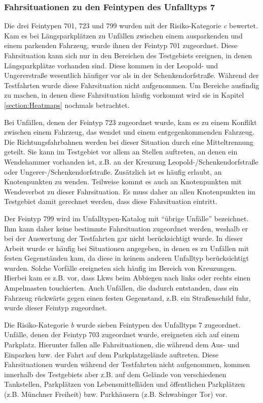 \subsubsection{Fahrsituationen zu den Feintypen des Unfalltyps 7}
Die drei Feintypen 701, 723 und 799 wurden mit der Risiko-Kategorie \textit{c} bewertet. Kam es bei Längsparkplätzen zu Unfällen zwischen einem ausparkenden und einem parkenden Fahrzeug, wurde ihnen der Feintyp 701 zugeordnet. Diese Fahrsituation kann sich nur in den Bereichen des Testgebiets ereignen, in denen Längsparkplätze vorhanden sind. Diese kommen in der Leopold- und Ungererstraße wesentlich häufiger vor als in der Schenkendorfstraße. Während der Testfahrten wurde diese Fahrsituation nicht aufgenommen. Um Bereiche ausfindig zu machen, in denen diese Fahrsituation häufig vorkommt wird sie in Kapitel \ref{section:Heatmaps} nochmals betrachtet.

Bei Unfällen, denen der Feintyp 723 zugeordnet wurde, kam es zu einem Konflikt zwischen einem Fahrzeug, das wendet und einem entgegenkommenden Fahrzeug. Die Richtungsfahrbahnen werden bei dieser Situation durch eine Mitteltrennung geteilt. Sie kann im Testgebiet vor allem an Stellen auftreten, an denen ein Wendehammer vorhanden ist, z.B. an der Kreuzung Leopold-/Schenkendorfstraße oder Ungerer-/Schenkendorfstraße. Zusätzlich ist es häufig erlaubt, an Knotenpunkten zu wenden. Teilweise kommt es auch an Knotenpunkten mit Wendeverbot zu dieser Fahrsituation. Es muss daher an allen Knotenpunkten im Testgebiet damit gerechnet werden, dass diese Fahrsituation eintritt.

Der Feintyp 799 wird im Unfalltypen-Katalog mit \enquote{übrige Unfälle} bezeichnet. Ihm kann daher keine bestimmte Fahrsituation zugeordnet werden, weshalb er bei der Auswertung der Testfahrten gar nicht berücksichtigt wurde. In dieser Arbeit wurde er häufig bei Situationen angegeben, in denen es zu Unfällen mit festen Gegenständen kam, da diese in keinem anderen Unfalltyp berücksichtigt wurden. Solche Vorfälle ereigneten sich häufig im Bereich von Kreuzungen. Hierbei kam es z.B. vor, dass Lkws beim Abbiegen nach links oder rechts einen Ampelmasten touchierten. Auch Unfällen, die dadurch entstanden, dass ein Fahrzeug rückwärts gegen einen festen Gegenstand, z.B. ein Straßenschild fuhr, wurde dieser Feintyp zugeordnet.

Die Risiko-Kategorie \textit{b} wurde sieben Feintypen des Unfalltyps 7 zugeordnet. Unfälle, denen der Feintyp 703 zugeordnet wurde, ereigneten sich auf einem Parkplatz. Hierunter fallen alle Fahrsituationen, die während dem Aus- und Einparken bzw. der Fahrt auf dem Parkplatzgelände auftreten. Diese Fahrsituationen wurden während der Testfahrten nicht aufgenommen, kommen innerhalb des Testgebiets aber z.B. auf dem Gelände von verschiedenen Tankstellen, Parkplätzen von Lebensmittelläden und öffentlichen Parkplätzen (z.B. Münchner Freiheit) bzw. Parkhäusern (z.B. Schwabinger Tor) vor.

